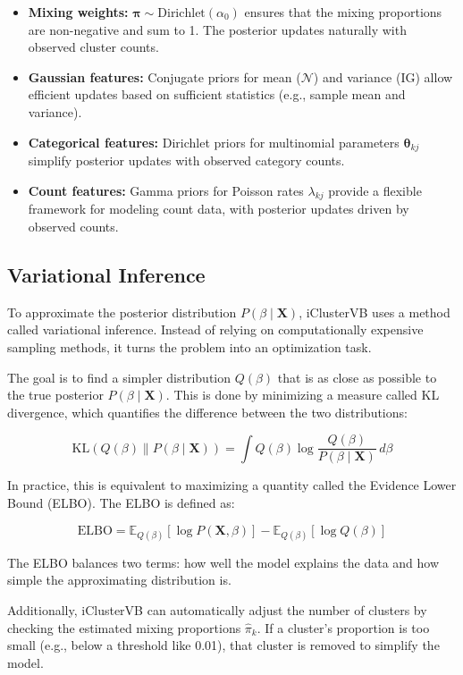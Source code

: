 \begin{itemize}
  \item \textbf{Mixing weights:} $\boldsymbol{\pi} \sim \text{Dirichlet}(\alpha_0)$ ensures that the mixing proportions are non-negative and sum to 1. The posterior updates naturally with observed cluster counts.
  \item \textbf{Gaussian features:} Conjugate priors for mean ($\mathcal{N}$) and variance ($\text{IG}$) allow efficient updates based on sufficient statistics (e.g., sample mean and variance).
  \item \textbf{Categorical features:} Dirichlet priors for multinomial parameters $\boldsymbol{\theta}_{kj}$ simplify posterior updates with observed category counts.
  \item \textbf{Count features:} Gamma priors for Poisson rates $\lambda_{kj}$ provide a flexible framework for modeling count data, with posterior updates driven by observed counts.
\end{itemize}

\subsection{Variational Inference}

  To approximate the posterior distribution $P(\beta \mid \mathbf{X})$, iClusterVB uses a method called variational inference. 
  Instead of relying on computationally expensive sampling methods, it turns the problem into an optimization task.

  The goal is to find a simpler distribution $Q(\beta)$ that is as close as possible to the true posterior
  $P(\beta \mid \mathbf{X})$. This is done by minimizing a measure called KL divergence,
  which quantifies the difference between the two distributions:

  \[
  \text{KL}(Q(\beta) \parallel P(\beta \mid \mathbf{X})) = \int Q(\beta) \log \frac{Q(\beta)}{P(\beta \mid \mathbf{X})} \, d\beta
  \]

  In practice, this is equivalent to maximizing a quantity called the Evidence Lower Bound (ELBO). The ELBO is defined as:

  \[
  \text{ELBO} = \mathbb{E}_{Q(\beta)}[\log P(\mathbf{X}, \beta)] - \mathbb{E}_{Q(\beta)}[\log Q(\beta)]
  \]

  The ELBO balances two terms: how well the model explains the data and how simple the approximating distribution is.

  Additionally, iClusterVB can automatically adjust the number of clusters by checking the estimated 
  mixing proportions $\hat{\pi}_k$. If a cluster's proportion is too small (e.g., below a threshold like 0.01),
  that cluster is removed to simplify the model.

